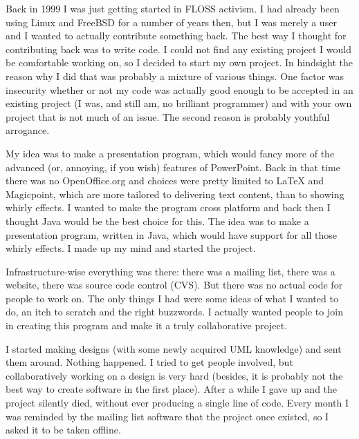 

Back in 1999 I was just getting started in FLOSS activism. I had already been
using Linux and FreeBSD for a number of years then, but I was merely a user and
I wanted to actually contribute something back. The best way I thought for
contributing back was to write code. I could not find any existing project I
would be comfortable working on, so I decided to start my own project. In
hindsight the reason why I did that was probably a mixture of various things.
One factor was insecurity whether or not my code was actually good enough to be
accepted in an existing project (I was, and still am, no brilliant programmer)
and with your own project that is not much of an issue. The second reason is
probably youthful arrogance.

My idea was to make a presentation program, which would fancy more of the
advanced (or, annoying, if you wish) features of PowerPoint. Back in that time
there was no OpenOffice.org and choices were pretty limited to LaTeX and
Magicpoint, which are more tailored to delivering text content, than to showing
whirly effects. I wanted to make the program cross platform and back then I
thought Java would be the best choice for this. The idea was to make a
presentation program, written in Java, which would have support for all those
whirly effects. I made up my mind and started the project.

Infrastructure-wise everything was there: there was a mailing list, there was a
website, there was source code control (CVS). But there was no actual code for
people to work on. The only things I had were some ideas of what I wanted to do,
an itch to scratch and the right buzzwords. I actually wanted people to join in
creating this program and make it a truly collaborative project.

I started making designs (with some newly acquired UML knowledge) and sent them
around. Nothing happened. I tried to get people involved, but collaboratively
working on a design is very hard (besides, it is probably not the best way to
create software in the first place). After a while I gave up and the project
silently died, without ever producing a single line of code. Every month I was
reminded by the mailing list software that the project once existed, so I asked
it to be taken offline.

